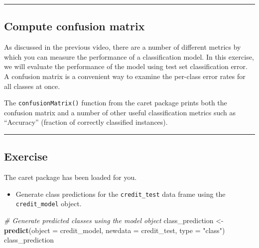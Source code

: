\documentclass[
]{book}
\newenvironment{Shaded}{\begin{snugshade}}{\end{snugshade}}
\newcommand{\CommentTok}[1]{\textcolor[rgb]{0.56,0.35,0.01}{\textit{#1}}}
\newcommand{\DataTypeTok}[1]{\textcolor[rgb]{0.13,0.29,0.53}{#1}}
\newcommand{\KeywordTok}[1]{\textcolor[rgb]{0.13,0.29,0.53}{\textbf{#1}}}
\newcommand{\NormalTok}[1]{#1}
\newcommand{\StringTok}[1]{\textcolor[rgb]{0.31,0.60,0.02}{#1}}
\providecommand{\tightlist}{%
  \setlength{\itemsep}{0pt}\setlength{\parskip}{0pt}}
\begin{document}
\begin{center}\rule{0.5\linewidth}{0.5pt}\end{center}

\hypertarget{compute-confusion-matrix}{%
\subsection{Compute confusion matrix}\label{compute-confusion-matrix}}

As discussed in the previous video, there are a number of different metrics by which you can measure the performance of a classification model. In this exercise, we will evaluate the performance of the model using test set classification error. A confusion matrix is a convenient way to examine the per-class error rates for all classes at once.

The \texttt{confusionMatrix()} function from the caret package prints both the confusion matrix and a number of other useful classification metrics such as ``Accuracy'' (fraction of correctly classified instances).

\begin{center}\rule{0.5\linewidth}{0.5pt}\end{center}

\hypertarget{exercise-2}{%
\subsection*{Exercise}\label{exercise-2}}

The caret package has been loaded for you.

\begin{itemize}
\tightlist
\item
  Generate class predictions for the \texttt{credit\_test} data frame using the \texttt{credit\_model} object.
\end{itemize}

\begin{Shaded}
\begin{Highlighting}[]
\CommentTok{# Generate predicted classes using the model object}
\NormalTok{class_prediction <-}\StringTok{ }\KeywordTok{predict}\NormalTok{(}\DataTypeTok{object =}\NormalTok{ credit_model,  }
                        \DataTypeTok{newdata =}\NormalTok{ credit_test,   }
                        \DataTypeTok{type =} \StringTok{"class"}\NormalTok{) }
\NormalTok{class_prediction}
\end{Highlighting}
\end{Shaded}
\end{document}
